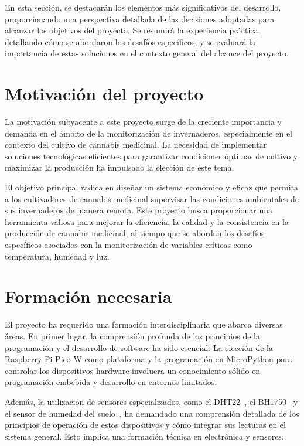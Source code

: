
En esta sección, se destacarán los elementos más significativos del desarrollo, proporcionando una perspectiva detallada de las decisiones adoptadas para alcanzar los objetivos del proyecto. Se resumirá la experiencia práctica, detallando cómo se abordaron los desafíos específicos, y se evaluará la importancia de estas soluciones en el contexto general del alcance del proyecto.

\section{Motivación del proyecto}

La motivación subyacente a este proyecto surge de la creciente importancia y demanda en el ámbito de la monitorización de invernaderos, especialmente en el contexto del cultivo de cannabis medicinal. La necesidad de implementar soluciones tecnológicas eficientes para garantizar condiciones óptimas de cultivo y maximizar la producción ha impulsado la elección de este tema.

El objetivo principal radica en diseñar un sistema económico y eficaz que permita a los cultivadores de cannabis medicinal supervisar las condiciones ambientales de sus invernaderos de manera remota. Este proyecto busca proporcionar una herramienta valiosa para mejorar la eficiencia, la calidad y la consistencia en la producción de cannabis medicinal, al tiempo que se abordan los desafíos específicos asociados con la monitorización de variables críticas como temperatura, humedad y luz.

\section{Formación necesaria}

El proyecto ha requerido una formación interdisciplinaria que abarca diversas áreas. En primer lugar, la comprensión profunda de los principios de la programación y el desarrollo de software ha sido esencial. La elección de la Raspberry Pi Pico W como plataforma y la programación en MicroPython para controlar los dispositivos hardware involucra un conocimiento sólido en programación embebida y desarrollo en entornos limitados.

Además, la utilización de sensores especializados, como el DHT22~\cite{manual:DHT22}, el BH1750~\cite{manual:BH1750} y el sensor de humedad del suelo~\cite{wiki:SensorHumedadSuelo}, ha demandado una comprensión detallada de los principios de operación de estos dispositivos y cómo integrar sus lecturas en el sistema general. Esto implica una formación técnica en electrónica y sensores.

